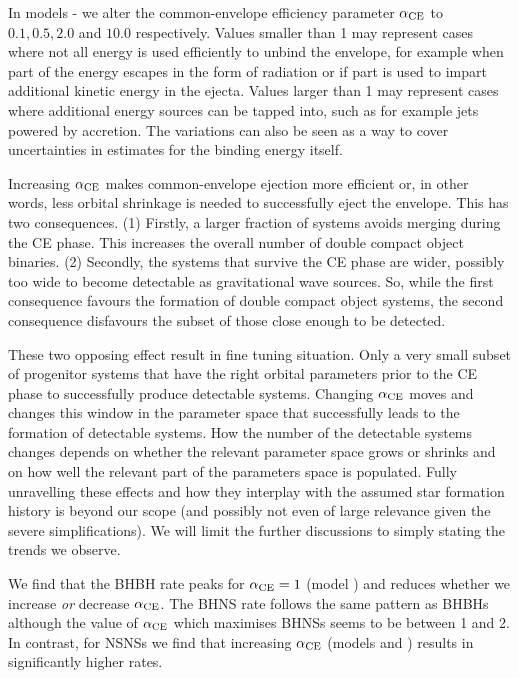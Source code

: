 In models \modAlphaLowest{}-\modAlphaHighest{} we alter the common-envelope efficiency parameter $\alpha_{\rm CE}$ to $0.1, 0.5, 2.0$ and $10.0$ respectively. Values smaller than 1 may represent cases where not all energy is used efficiently to unbind the envelope, for example when part of the energy escapes in the form of radiation or if part is used to impart additional kinetic energy in the ejecta. Values larger than 1 may represent cases where additional energy sources can be tapped into, such as for example jets powered by accretion. The variations can also be seen as a way to cover uncertainties in estimates for the binding energy itself.  

Increasing $\alpha_{\rm CE}$ makes common-envelope ejection more efficient or, in other words, less orbital shrinkage is needed to successfully eject the envelope. This has two consequences. (1) Firstly, a larger fraction of systems avoids merging during the CE phase. This increases the overall number of double compact object binaries. (2) Secondly, the systems that survive the CE phase are wider, possibly too wide to become detectable as gravitational wave sources. So, while the first consequence favours the formation of double compact object systems, the second consequence disfavours the subset of those close enough to be detected. 

These two opposing effect result in fine tuning situation. Only a very small subset of progenitor systems that have the right orbital parameters prior to the CE phase to successfully produce detectable systems. Changing  $\alpha_{\rm CE}$ moves and changes this window in the parameter space that successfully leads to the formation of detectable systems. How the number of the detectable systems changes depends on whether the relevant parameter space grows or shrinks and on how well the relevant part of the parameters space is populated. Fully unravelling these effects and how they interplay with the assumed star formation history is beyond our scope (and possibly not even of large relevance given the severe simplifications). We will limit the further discussions to simply stating the trends we observe.

We find that the BHBH rate peaks for $\alpha_{\rm CE} = 1$ (model \modFid{}) and reduces whether we increase \textit{or} decrease $\alpha_{\rm CE}$. The BHNS rate follows the same pattern as BHBHs although the value of $\alpha_{\rm CE}$ which maximises BHNSs seems to be between 1 and 2. In contrast, for NSNSs we find that increasing $\alpha_{\rm CE}$ (models \modAlphaHigh{} and \modAlphaHighest{}) results in significantly higher rates. 

